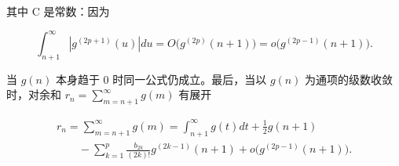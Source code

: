 其中 C 是常数：因为

\[
\int_ {n + 1} ^ {\infty} \left| g ^ {(2 p + 1)} (u) \right| d u = O \big (g ^ {(2 p)} (n + 1) \big) = o \big (g ^ {(2 p - 1)} (n + 1) \big).
\]

当 \(g(n)\) 本身趋于 0 时同一公式仍成立。最后，当以 \(g(n)\) 为通项的级数收敛时，对余和 \(r_n = \sum_{m=n+1}^{\infty} g(m)\) 有展开

\[
\begin{array}{l} r _ {n} = \sum_ {m = n + 1} ^ {\infty} g (m) = \int_ {n + 1} ^ {\infty} g (t) d t + \frac {1}{2} g (n + 1) \\ \qquad - \sum_ {k = 1} ^ {p} \frac {b _ {2 k}}{(2 k) !} g ^ {(2 k - 1)} (n + 1) + o \big (g ^ {(2 p - 1)} (n + 1) \big). \end{array}
\]

\setcounter{exercisegroup}{0}
